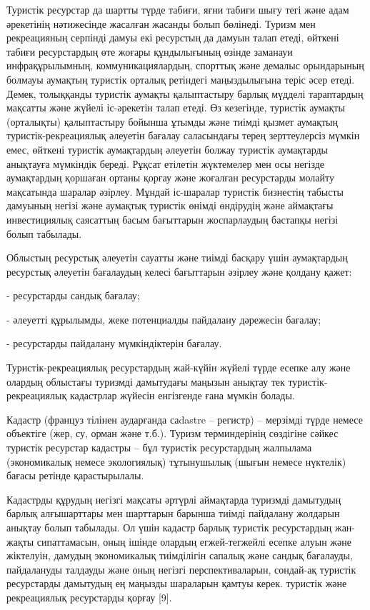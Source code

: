 Туристік ресурстар да шартты түрде табиғи, яғни табиғи шығу тегі және
адам әрекетінің нәтижесінде жасалған жасанды болып бөлінеді. Туризм мен
рекреацияның серпінді дамуы екі ресурстың да дамуын талап етеді, өйткені
табиғи ресурстардың өте жоғары құндылығының өзінде заманауи
инфрақұрылымның, коммуникациялардың, спорттық және демалыс орындарының
болмауы аумақтың туристік орталық ретіндегі маңыздылығына теріс әсер
етеді. Демек, толыққанды туристік аумақты қалыптастыру барлық мүдделі
тараптардың мақсатты және жүйелі іс-әрекетін талап етеді. Өз кезегінде,
туристік аумақты (орталықты) қалыптастыру бойынша ұтымды және тиімді
қызмет аумақтың туристік-рекреациялық әлеуетін бағалау саласындағы терең
зерттеулерсіз мүмкін емес, өйткені туристік аумақтардың әлеуетін болжау
туристік аумақтарды анықтауға мүмкіндік береді. Рұқсат етілетін
жүктемелер мен осы негізде аумақтардың қоршаған ортаны қорғау және
жоғалған ресурстарды молайту мақсатында шаралар әзірлеу. Мұндай
іс-шаралар туристік бизнестің табысты дамуының негізі және аумақтық
туристік өнімді өндірудің және аймақтағы инвестициялық саясаттың басым
бағыттарын жоспарлаудың бастапқы негізі болып табылады.

Облыстың ресурстық әлеуетін сауатты және тиімді басқару үшін аумақтардың
ресурстық әлеуетін бағалаудың келесі бағыттарын әзірлеу және қолдану
қажет:

- ресурстарды сандық бағалау;

- әлеуетті құрылымды, жеке потенциалды пайдалану дәрежесін бағалау;

- ресурстарды пайдалану мүмкіндіктерін бағалау.

Туристік-рекреациялық ресурстардың жай-күйін жүйелі түрде есепке алу
және олардың облыстағы туризмді дамытудағы маңызын анықтау тек
туристік-рекреациялық кадастрлар жүйесін енгізгенде ғана мүмкін болады.

Кадастр (француз тілінен аударғанда саdastre -- регистр) -- мерзімді
түрде немесе объектіге (жер, су, орман және т.б.). Туризм терминдерінің
сөздігіне сәйкес туристік ресурстар кадастры -- бұл туристік
ресурстардың жалпылама (экономикалық немесе экологиялық) тұтынушылық
(шығын немесе нүктелік) бағасы ретінде қарастырылалы.

Кадастрды құрудың негізгі мақсаты әртүрлі аймақтарда туризмді дамытудың
барлық алғышарттары мен шарттарын барынша тиімді пайдалану жолдарын
анықтау болып табылады. Ол үшін кадастр барлық туристік ресурстардың
жан-жақты сипаттамасын, оның ішінде олардың егжей-тегжейлі есепке алуын
және жіктелуін, дамудың экономикалық тиімділігін сапалық және сандық
бағалауды, пайдалануды талдауды және оның негізгі перспективаларын,
сондай-ақ туристік ресурстарды дамытудың ең маңызды шараларын қамтуы
керек. туристік және рекреациялық ресурстарды қорғау {[}9{]}.

